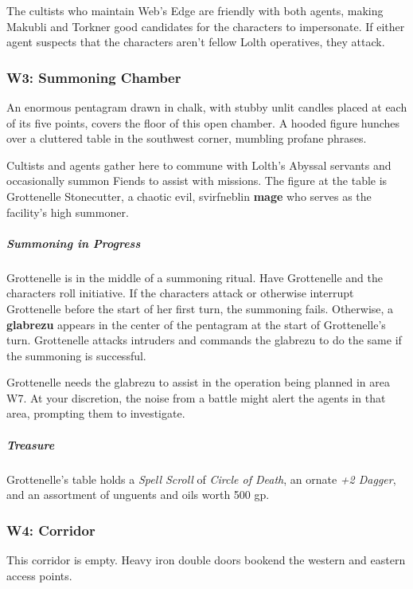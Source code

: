 \documentclass[10pt,a4paper,twoside,bg=print,twocolumn,openany,nodeprecatedcode]{dndbook}
\begin{document}
The cultists who maintain Web's Edge are friendly with both agents, making Makubli and Torkner good candidates for the characters to impersonate. If either agent suspects that the characters aren't fellow Lolth operatives, they attack.

\subsubsection{W3: Summoning Chamber}
\begin{DndReadAloud}{}
An enormous pentagram drawn in chalk, with stubby unlit candles placed at each of its five points, covers the floor of this open chamber. A hooded figure hunches over a cluttered table in the southwest corner, mumbling profane phrases.

\end{DndReadAloud}

Cultists and agents gather here to commune with Lolth's Abyssal servants and occasionally summon Fiends to assist with missions. The figure at the table is Grottenelle Stonecutter, a chaotic evil, svirfneblin \textbf{mage} who serves as the facility's high summoner.

\subparagraph{Summoning in Progress}
Grottenelle is in the middle of a summoning ritual. Have Grottenelle and the characters roll initiative. If the characters attack or otherwise interrupt Grottenelle before the start of her first turn, the summoning fails. Otherwise, a \textbf{glabrezu} appears in the center of the pentagram at the start of Grottenelle's turn. Grottenelle attacks intruders and commands the glabrezu to do the same if the summoning is successful.

Grottenelle needs the glabrezu to assist in the operation being planned in area W7. At your discretion, the noise from a battle might alert the agents in that area, prompting them to investigate.

\subparagraph{Treasure}
Grottenelle's table holds a \textit{Spell Scroll} of \textit{Circle of Death}, an ornate \textit{+2 Dagger}, and an assortment of unguents and oils worth 500 gp.

\subsubsection{W4: Corridor}
\begin{DndReadAloud}{}
This corridor is empty. Heavy iron double doors bookend the western and eastern access points.

\end{DndReadAloud}
\end{document}
